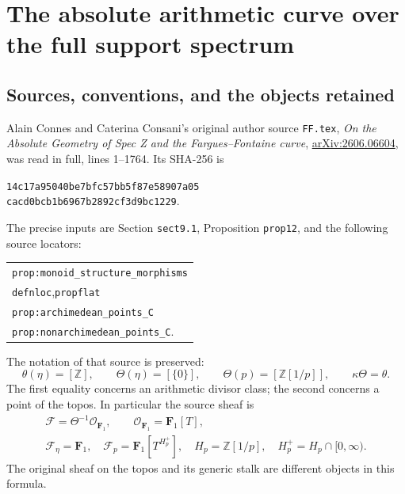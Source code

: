 \section{The absolute arithmetic curve over the full support spectrum}
\subsection{Sources, conventions, and the objects retained}
Alain Connes and Caterina Consani's original author source
\nolinkurl{FF.tex}, \emph{On the Absolute Geometry of Spec Z and the
Fargues--Fontaine curve},
\href{https://arxiv.org/abs/2606.06604}{arXiv:2606.06604}, was read in
full, lines 1--1764. Its SHA-256 is
\begin{center}\small\texttt{14c17a95040be7bfc57bb5f87e58907a05}\\
\texttt{cacd0bcb1b6967b2892cf3d9bc1229}.\end{center}
The precise inputs are Section \texttt{sect9.1}, Proposition
\texttt{prop12}, and the following source locators:
\begin{center}\small
\begin{tabular}{l}
\texttt{prop:monoid\_structure\_morphisms}\\
\texttt{defnloc},\quad \texttt{propflat}\\
\texttt{prop:archimedean\_points\_C}\\
\texttt{prop:nonarchimedean\_points\_C}.
\end{tabular}
\end{center}
The notation of that source is
preserved:
\begin{equation}\tag{ACF1}
 \theta(\eta)=[\mathbb Z],\qquad
 \Theta(\eta)=[\{0\}],\qquad
 \Theta(p)=[\mathbb Z[1/p]],\qquad \kappa\Theta=\theta.
\end{equation}
The first equality concerns an arithmetic divisor class; the second
concerns a point of the topos. In particular the source sheaf is
\begin{equation}\tag{ACF2}
 \begin{gathered}
 \mathcal F=\Theta^{-1}\mathcal O_{\mathbf F_1},\qquad
 \mathcal O_{\mathbf F_1}=\mathbf F_1[T],\\
 \mathcal F_\eta=\mathbf F_1,\quad
 \mathcal F_p=\mathbf F_1[T^{H_p^+}],\quad
 H_p=\mathbb Z[1/p],\quad H_p^+=H_p\cap[0,\infty).
 \end{gathered}
\end{equation}
The original sheaf on the topos and its generic stalk are different
objects in this formula.


